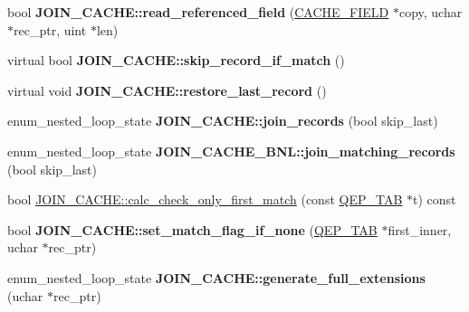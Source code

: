 \begin{DoxyCompactItemize}
\item 
\mbox{\label{group__Query__Optimizer_ga66b36ae5a54a63d5fb2fe863a036aa08}} 
bool {\bfseries J\+O\+I\+N\+\_\+\+C\+A\+C\+H\+E\+::read\+\_\+referenced\+\_\+field} (\mbox{\hyperlink{structst__cache__field}{C\+A\+C\+H\+E\+\_\+\+F\+I\+E\+LD}} $\ast$copy, uchar $\ast$rec\+\_\+ptr, uint $\ast$len)
\item 
\mbox{\label{group__Query__Optimizer_gafbb269cde39ce62236de5b481296de21}} 
virtual bool {\bfseries J\+O\+I\+N\+\_\+\+C\+A\+C\+H\+E\+::skip\+\_\+record\+\_\+if\+\_\+match} ()
\item 
\mbox{\label{group__Query__Optimizer_gae3feda29f01cc03251f55a0b00511d7a}} 
virtual void {\bfseries J\+O\+I\+N\+\_\+\+C\+A\+C\+H\+E\+::restore\+\_\+last\+\_\+record} ()
\item 
\mbox{\label{group__Query__Optimizer_ga66879154541707521bc3d07829084c2e}} 
enum\+\_\+nested\+\_\+loop\+\_\+state {\bfseries J\+O\+I\+N\+\_\+\+C\+A\+C\+H\+E\+::join\+\_\+records} (bool skip\+\_\+last)
\item 
\mbox{\label{group__Query__Optimizer_ga05271c0a916273b7f8b934fbaab623bd}} 
enum\+\_\+nested\+\_\+loop\+\_\+state {\bfseries J\+O\+I\+N\+\_\+\+C\+A\+C\+H\+E\+\_\+\+B\+N\+L\+::join\+\_\+matching\+\_\+records} (bool skip\+\_\+last)
\item 
bool \mbox{\hyperlink{group__Query__Optimizer_ga680b1522161dd38adbc48197df3ea115}{J\+O\+I\+N\+\_\+\+C\+A\+C\+H\+E\+::calc\+\_\+check\+\_\+only\+\_\+first\+\_\+match}} (const \mbox{\hyperlink{classQEP__TAB}{Q\+E\+P\+\_\+\+T\+AB}} $\ast$t) const
\item 
\mbox{\label{group__Query__Optimizer_ga90ada3645fd27523d6cfa7fc073ba4ad}} 
bool {\bfseries J\+O\+I\+N\+\_\+\+C\+A\+C\+H\+E\+::set\+\_\+match\+\_\+flag\+\_\+if\+\_\+none} (\mbox{\hyperlink{classQEP__TAB}{Q\+E\+P\+\_\+\+T\+AB}} $\ast$first\+\_\+inner, uchar $\ast$rec\+\_\+ptr)
\item 
\mbox{\label{group__Query__Optimizer_ga774240988bd63b547442150fd459e6d2}} 
enum\+\_\+nested\+\_\+loop\+\_\+state {\bfseries J\+O\+I\+N\+\_\+\+C\+A\+C\+H\+E\+::generate\+\_\+full\+\_\+extensions} (uchar $\ast$rec\+\_\+ptr)

\end{DoxyCompactItemize}
